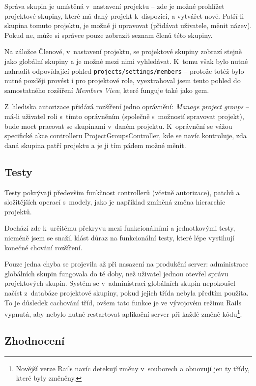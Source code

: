 \documentclass[thesis=B,czech]{FITthesis}[2012/05/02]
\begin{document}
Správa skupin je umístěná v~nastavení projektu -- zde je možné prohlížet
projektové skupiny, které má daný projekt k~dispozici, a vytvářet nové.
Patří-li skupina tomuto projektu, je možné ji upravovat (přidávat
uživatele, měnit název). Pokud ne, může si správce pouze zobrazit seznam
členů této skupiny.

Na záložce Členové, v~nastavení projektu, se projektové skupiny zobrazí
stejně jako globální skupiny a je možné mezi nimi vyhledávat. K~tomu
však bylo nutné nahradit odpovídající pohled
\lstinline!projects/settings/members! -- protože totéž bylo nutné
později provést i pro projektové role, vyextrahoval jsem tento pohled do
samostatného rozšíření \emph{Members View},
které funguje také jako \gls{gem}.

Z~hlediska autorizace přidává rozšíření jedno oprávnění: \emph{Manage
project groups} -- má-li uživatel roli s~tímto oprávněním (společně
s~možností spravovat projekt), bude moct pracovat se skupinami v~daném
projektu. K~oprávnění se vážou specifické akce controlleru
ProjectGroupsController, kde se navíc kontroluje, zda daná skupina patří
projektu a je ji tím pádem možné měnit.

\subsection{Testy}

Testy pokrývají především funkčnost controllerů (včetně autorizace),
patchů a složitějších operací s~modely, jako je například zmíněná změna
hierarchie projektů.

Dochází zde k~určitému překryvu mezi funkcionálními a jednotkovými testy, nicméně
jsem se snažil klást důraz na funkcionální testy, které lépe vystihují
konečné chování rozšíření.

Pouze jedna chyba se projevila až při nasazení na produkční server:
administrace globálních skupin fungovala do té doby, než uživatel jednou
otevřel správu projektových skupin. Systém se v~administraci globálních
skupin nepokoušel načíst z~databáze projektové skupiny, pokud jejich
třída nebyla předtím použita. To je důsledek cachování tříd, ovšem tato funkce je
ve vývojovém režimu Rails vypnutá, aby nebylo nutné restartovat
aplikační server při každé změně kódu\footnote{Novější verze Rails navíc
  detekují změny v~souborech a obnovují jen ty třídy, které byly
  změněny.}.

\subsection{Zhodnocení}
\end{document}
